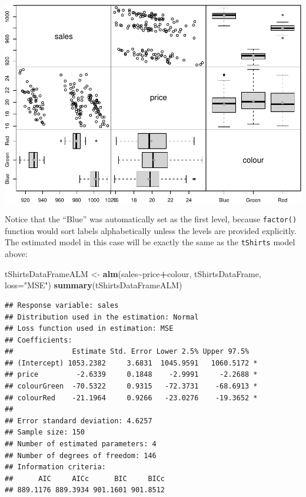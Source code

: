 \documentclass[
]{book}
\newenvironment{Shaded}{\begin{snugshade}}{\end{snugshade}}
\newcommand{\DataTypeTok}[1]{\textcolor[rgb]{0.13,0.29,0.53}{#1}}
\newcommand{\KeywordTok}[1]{\textcolor[rgb]{0.13,0.29,0.53}{\textbf{#1}}}
\newcommand{\NormalTok}[1]{#1}
\newcommand{\OperatorTok}[1]{\textcolor[rgb]{0.81,0.36,0.00}{\textbf{#1}}}
\newcommand{\StringTok}[1]{\textcolor[rgb]{0.31,0.60,0.02}{#1}}
\theoremstyle{definition}
\theoremstyle{definition}
\theoremstyle{definition}
\theoremstyle{definition}
\theoremstyle{remark}
\begin{document}
\includegraphics{Svetunkov---Statistics-for-Business-Analytics_files/figure-latex/unnamed-chunk-80-1.pdf}

Notice that the ``Blue'' was automatically set as the first level, because \texttt{factor()} function would sort labels alphabetically unless the levels are provided explicitly. The estimated model in this case will be exactly the same as the \texttt{tShirts} model above:

\begin{Shaded}
\begin{Highlighting}[]
\NormalTok{tShirtsDataFrameALM \textless{}{-}}\StringTok{ }\KeywordTok{alm}\NormalTok{(sales}\OperatorTok{\textasciitilde{}}\NormalTok{price}\OperatorTok{+}\NormalTok{colour, tShirtsDataFrame, }\DataTypeTok{loss=}\StringTok{"MSE"}\NormalTok{)}
\KeywordTok{summary}\NormalTok{(tShirtsDataFrameALM)}
\end{Highlighting}
\end{Shaded}

\begin{verbatim}
## Response variable: sales
## Distribution used in the estimation: Normal
## Loss function used in estimation: MSE
## Coefficients:
##              Estimate Std. Error Lower 2.5% Upper 97.5%  
## (Intercept) 1053.2382     3.6831  1045.9591   1060.5172 *
## price         -2.6339     0.1848    -2.9991     -2.2688 *
## colourGreen  -70.5322     0.9315   -72.3731    -68.6913 *
## colourRed    -21.1964     0.9266   -23.0276    -19.3652 *
## 
## Error standard deviation: 4.6257
## Sample size: 150
## Number of estimated parameters: 4
## Number of degrees of freedom: 146
## Information criteria:
##      AIC     AICc      BIC     BICc 
## 889.1176 889.3934 901.1601 901.8512
\end{verbatim}
\end{document}
